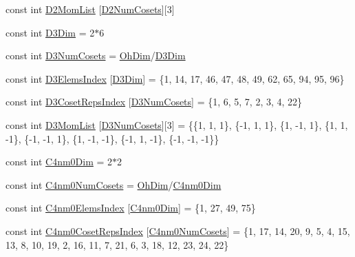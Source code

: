 \begin{DoxyCompactItemize}
\item 
const int \mbox{\hyperlink{namespaceHadron_abcf1382c26424df96bdeef91a583d542}{D2\+Mom\+List}} \mbox{[}\mbox{\hyperlink{namespaceHadron_a4e182e6efe3c7594360137b45836d532}{D2\+Num\+Cosets}}\mbox{]}\mbox{[}3\mbox{]}
\item 
const int \mbox{\hyperlink{namespaceHadron_ab94267da351bd0fdc72c0d49d22e617b}{D3\+Dim}} = 2$\ast$6
\item 
const int \mbox{\hyperlink{namespaceHadron_a495e958948d0b6cdeb09a3f94e11c014}{D3\+Num\+Cosets}} = \mbox{\hyperlink{namespaceHadron_a2bea98b7ecd13619ef78b6d204d59707}{Oh\+Dim}}/\mbox{\hyperlink{namespaceHadron_ab94267da351bd0fdc72c0d49d22e617b}{D3\+Dim}}
\item 
const int \mbox{\hyperlink{namespaceHadron_a222de40612665f1829700d29a3f27eae}{D3\+Elems\+Index}} \mbox{[}\mbox{\hyperlink{namespaceHadron_ab94267da351bd0fdc72c0d49d22e617b}{D3\+Dim}}\mbox{]} = \{1, 14, 17, 46, 47, 48, 49, 62, 65, 94, 95, 96\}
\item 
const int \mbox{\hyperlink{namespaceHadron_a9bef0e0898639097c24679733aa4d9ac}{D3\+Coset\+Reps\+Index}} \mbox{[}\mbox{\hyperlink{namespaceHadron_a495e958948d0b6cdeb09a3f94e11c014}{D3\+Num\+Cosets}}\mbox{]} = \{1, 6, 5, 7, 2, 3, 4, 22\}
\item 
const int \mbox{\hyperlink{namespaceHadron_a704848c20f046c1a4918279e713ec12a}{D3\+Mom\+List}} \mbox{[}\mbox{\hyperlink{namespaceHadron_a495e958948d0b6cdeb09a3f94e11c014}{D3\+Num\+Cosets}}\mbox{]}\mbox{[}3\mbox{]} = \{\{1, 1, 1\}, \{-\/1, 1, 1\}, \{1, -\/1, 1\}, \{1, 1, -\/1\}, \{-\/1, -\/1, 1\}, \{1, -\/1, -\/1\}, \{-\/1, 1, -\/1\}, \{-\/1, -\/1, -\/1\}\}
\item 
const int \mbox{\hyperlink{namespaceHadron_afdf5d754d40795de402712dfe4fa0ab7}{C4nm0\+Dim}} = 2$\ast$2
\item 
const int \mbox{\hyperlink{namespaceHadron_a8e76f646995d145588abe6831d8e9041}{C4nm0\+Num\+Cosets}} = \mbox{\hyperlink{namespaceHadron_a2bea98b7ecd13619ef78b6d204d59707}{Oh\+Dim}}/\mbox{\hyperlink{namespaceHadron_afdf5d754d40795de402712dfe4fa0ab7}{C4nm0\+Dim}}
\item 
const int \mbox{\hyperlink{namespaceHadron_aa91371705a6f56faa960ddfffb4d9ac3}{C4nm0\+Elems\+Index}} \mbox{[}\mbox{\hyperlink{namespaceHadron_afdf5d754d40795de402712dfe4fa0ab7}{C4nm0\+Dim}}\mbox{]} = \{1, 27, 49, 75\}
\item 
const int \mbox{\hyperlink{namespaceHadron_a4c7ee5beb68f90860442a2a1567ee9bd}{C4nm0\+Coset\+Reps\+Index}} \mbox{[}\mbox{\hyperlink{namespaceHadron_a8e76f646995d145588abe6831d8e9041}{C4nm0\+Num\+Cosets}}\mbox{]} = \{1, 17, 14, 20, 9, 5, 4, 15, 13, 8, 10, 19, 2, 16, 11, 7, 21, 6, 3, 18, 12, 23, 24, 22\}

\end{DoxyCompactItemize}
